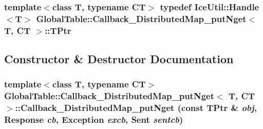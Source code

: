 \label{class_global_table_1_1_callback___distributed_map__put_nget_a66e1df0479df703206b863c898f0d9dd}
\hypertarget{class_global_table_1_1_callback___distributed_map__put_nget_a037a94498b05c6b5fc70ba285bc371d3}{
\subsubsection[{TPtr}]{\setlength{\rightskip}{0pt plus 5cm}template$<$class T, typename CT$>$ typedef IceUtil::Handle$<$T$>$ {\bf GlobalTable::Callback\_\-DistributedMap\_\-putNget}$<$ T, CT $>$::{\bf TPtr}}}
\label{class_global_table_1_1_callback___distributed_map__put_nget_a037a94498b05c6b5fc70ba285bc371d3}


\subsection{Constructor \& Destructor Documentation}
\hypertarget{class_global_table_1_1_callback___distributed_map__put_nget_ae7d20531c175006422ca74fc388d296f}{
\subsubsection[{Callback\_\-DistributedMap\_\-putNget}]{\setlength{\rightskip}{0pt plus 5cm}template$<$class T, typename CT$>$ {\bf GlobalTable::Callback\_\-DistributedMap\_\-putNget}$<$ T, CT $>$::{\bf Callback\_\-DistributedMap\_\-putNget} (const {\bf TPtr} \& {\em obj}, \/  {\bf Response} {\em cb}, \/  {\bf Exception} {\em excb}, \/  {\bf Sent} {\em sentcb})}}
\label{class_global_table_1_1_callback___distributed_map__put_nget_ae7d20531c175006422ca74fc388d296f}


